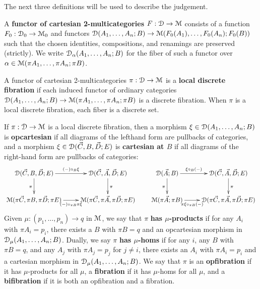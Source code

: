 The next three definitions will be used to describe the
 judgement.  

\begin{definition}
  A \textbf{functor of cartesian 2-multicategories} $F:\mathcal{D}\to\mathcal{M}$
  consists of a function $F_0 : \mathcal{D}_0 \to \mathcal{M}_0$ and functors
  $\mathcal{D}(A_1,\ldots,A_n;B) \to \mathcal{M}(F_0(A_1),\ldots,F_0(A_n);F_0(B))$ such
  that the chosen identities, compositions, and renamings are preserved
  (strictly).  We write $\mathcal{D}_\alpha(A_1,\dots,A_n;B)$ for the fiber of
  such a functor over $\alpha \in \mathcal{M}(\pi A_1,\dots,\pi A_n;\pi B)$.
\end{definition}

\begin{definition}
  A functor of cartesian 2-multicategories $\pi:\mathcal{D}\to\mathcal{M}$ is a
  \textbf{local discrete fibration} if each induced functor of ordinary
  categories $\mathcal{D}(A_1,\dots,A_n;B)\to\mathcal{M}(\pi A_1,\dots,\pi A_n;\pi B)$ is
  a discrete fibration.  When $\pi$ is a local discrete fibration, each
  fiber is a discrete set.
\end{definition}

\begin{definition}
  If $\pi:\mathcal{D}\to\mathcal{M}$ is a local discrete fibration, then a morphism
  $\xi\in\mathcal{D}(A_1,\dots,A_n;B)$ is \textbf{opcartesian} if all diagrams
  of the lefthand form are pullbacks of categories, and a morphism
  $\xi\in\mathcal{D}(\vec C,B,\vec D;E)$ is \textbf{cartesian at $B$} if all
  diagrams of the right-hand form are pullbacks of categories: 
  \[ \xymatrix{
    \cD(\vec C,B,\vec D;E) \ar[r]^-{(-)\circ_B \xi} \ar[d]_\pi &
    \cD(\vec C,\vec A,\vec D;E) \ar[d]^\pi \\
    \M(\pi\vec C,\pi B, \pi\vec D; \pi E) \ar[r]_-{(-)\circ_{\pi B} \pi\xi} &
    \M(\pi\vec C,\pi\vec A,\pi\vec D;\pi E)
  }
  \qquad
  \xymatrix{
    \cD(\vec A;B) \ar[r]^-{\xi\circ_B (-)} \ar[d]_\pi &
    \cD(\vec C,\vec A,\vec D;E) \ar[d]^\pi \\
    \M(\pi\vec A;\pi B) \ar[r]_-{\pi\xi\circ_{\pi B} (-)} &
    \cD(\pi\vec C,\pi\vec A,\pi\vec D;\pi E)}
  \]
  Given $\mu:(p_1,\dots,p_n) \to q$ in $\mathcal{M}$, we say that $\pi$ \textbf{has $\mu$-products} if for any $A_i$ with $\pi A_i = p_i$, there exists a $B$ with $\pi B = q$ and an opcartesian morphism in $\mathcal{D}_\mu(A_1,\dots,A_n;B)$.
  Dually, we say $\pi$ \textbf{has $\mu$-homs} if for any $i$, any $B$ with $\pi B = q$, and any $A_j$ with $\pi A_j = p_j$ for $j\neq i$, there exists an $A_i$ with $\pi A_i = p_i$ and a cartesian morphism in $\mathcal{D}_\mu(A_1,\dots,A_n;B)$.
  We say that $\pi$ is an \textbf{opfibration} if it has $\mu$-products for all $\mu$, a \textbf{fibration} if it has $\mu$-homs for all $\mu$, and a \textbf{bifibration} if it is both an opfibration and a fibration.
\end{definition}

